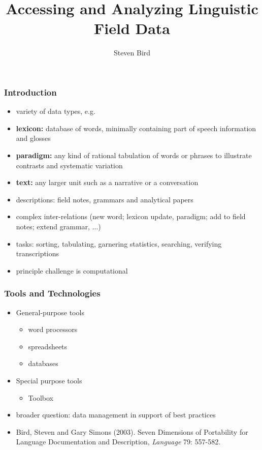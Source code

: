 \documentclass{beamer}             %
\title{Accessing and Analyzing Linguistic Field Data}
\author{Steven Bird}
\institute{
  University of Melbourne, AUSTRALIA
}
\begin{document}
\begin{frame}
  \titlepage
\end{frame}


\begin{frame}
  \frametitle{Introduction}
  \begin{itemize}
  \item variety of data types, e.g.
  \item \textbf{lexicon:} database of words, minimally containing part
    of speech information and glosses
  \item \textbf{paradigm:} any kind of rational
    tabulation of words or phrases to illustrate contrasts and systematic
    variation
  \item \textbf{text:} any larger unit such as a narrative or a
    conversation
  \item descriptions: field notes, grammars and analytical papers
  \item complex inter-relations (new word; lexicon update, paradigm;
    add to field notes; extend grammar, ...)
  \item tasks: sorting, tabulating, garnering statistics, searching,
  verifying transcriptions
  \item principle challenge is computational
  \end{itemize}

\end{frame}

\begin{frame}
\frametitle{Tools and Technologies}
\begin{itemize}
\item General-purpose tools
  \begin{itemize}
  \item word processors
  \item spreadsheets
  \item databases
  \end{itemize}
\item Special purpose tools
  \begin{itemize}
  \item Toolbox
  \end{itemize}
\item broader question: data management in support of best practices
\item Bird, Steven and Gary Simons (2003).  Seven Dimensions of Portability
    for Language Documentation and Description, \textit{Language} 79: 557-582.
\end{itemize}
\end{frame}
\end{document}
